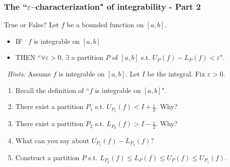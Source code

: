 \documentclass[14pt]{beamer}
\newcommand{\e}{\varepsilon}
\newcommand{\setsize}[1]{\fontsize{#1}{#1}\selectfont} %
\begin{document}
	\begin{frame}[t]
		\setsize{11}
		\frametitle{The ``$\e$--characterization" of integrability - Part 2}

		\begin{block}{\setsize{11} True or False?}
			Let $f$ be a bounded function on $[a,b]$.
			\begin{itemize}
				\item IF \quad \quad \, $f$ is integrable on $[a,b]$

				\item THEN \hfill ``$\forall \varepsilon>0$, $\exists$ a partition $P$
					of $[a,b]$ s.t. ${\displaystyle U_P(f) - L_P(f) < \varepsilon}$".
			\end{itemize}
		\end{block}

		\
 \emph{Hints:} Assume $f$ is integrable on $[a,b]$. Let $I$ be the integral.
		Fix $\varepsilon>0$.
		\begin{enumerate}
			\item Recall the definition of ``$f$ is integrable on $[a,b]$".

			\item There exist a partition $P_{1}$ s.t.
				${\displaystyle  U_{P_1}(f) < I + \frac{\varepsilon}{2}}$. Why?

			\item There exist a partition $P_{2}$ s.t.
				${\displaystyle  L_{P_2}(f) > I - \frac{\varepsilon}{2}}$. Why?

			\item What can you say about ${\displaystyle U_{P_1}(f) - L_{P_2}(f)}$?
				\vspace{.1cm}

			\item Construct a partition $P$ s.t.
				${\displaystyle L_{P_2}(f) \leq L_P(f) \leq U_P(f) \leq U_{P_1}(f)}$.
		\end{enumerate}
	\end{frame}
\end{document}
